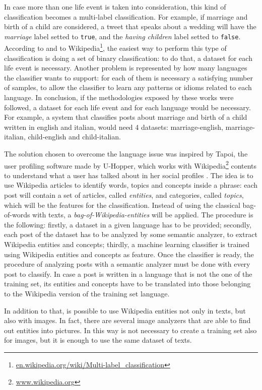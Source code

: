 In case more than one life event is taken into consideration, this kind of classification becomes a multi-label classification. For example, if marriage and birth of a child are considered, a tweet that speaks about a wedding will have the \emph{marriage} label setted to \texttt{true}, and the \emph{having children} label setted to \texttt{false}. According to \cite{cavalinclassification} and to Wikipedia\footnote{\url{en.wikipedia.org/wiki/Multi-label_classification}}, the easiest way to perform this type of classification is doing a set of binary classification: to do that, a dataset for each life event is necessary. Another problem is represented by how many languages the classifier wants to support: for each of them is necessary a satisfying number of samples, to allow the classifier to learn any patterns or idioms related to each language. In conclusion, if the methodologies exposed by these works were followed, a dataset for each life event and for each language would be necessary. For example, a system that classifies posts about marriage and birth of a child written in english and italian, would need 4 datasets: marriage-english, marriage-italian, child-english and child-italian.

The solution chosen to overcome the language issue was inspired by Tapoi, the user profiling software made by U-Hopper, which works with Wikipedia\footnote{\url{www.wikipedia.org}} contents to understand what a user has talked about in her social profiles \cite{torrero2018wikipedia}. The idea is to use Wikipedia articles to identify words, topics and concepts inside a phrase: each post will contain a set of articles, called \emph{entities}, and categories, called \emph{topics}, which will be the features for the classification. Instead of using the classical bag-of-words with texts, a \emph{bag-of-Wikipedia-entities} will be applied. The procedure is the following: firstly, a dataset in a given language has to be provided; secondly, each post of the dataset has to be analyzed by some semantic analyzer, to extract Wikipedia entities and concepts; thirdly, a machine learning classifier is trained using Wikipedia entities and concepts as feature. Once the classifier is ready, the procedure of analyzing posts with a semantic analyzer must be done with every post to classify. In case a post is written in a language that is not the one of the training set, its entities and concepts have to be translated into those belonging to the Wikipedia version of the training set language.

In addition to that, is possible to use Wikipedia entities not only in texts, but also with images. In fact, there are several image analyzers that are able to find out entities into pictures. In this way is not necessary to create a training set also for images, but it is enough to use the same dataset of texts.

